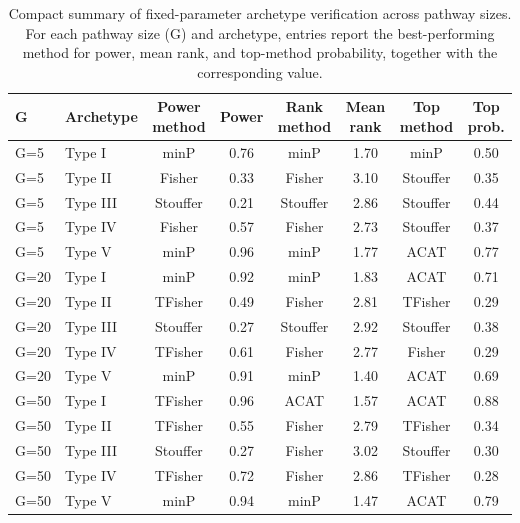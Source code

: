 \begin{table}[!t]
\centering
\caption{Compact summary of fixed-parameter archetype verification across pathway sizes. For each pathway size (G) and archetype, entries report the best-performing method for power, mean rank, and top-method probability, together with the corresponding value.}
\label{tab:supp_archetype_verification_byG}
\small
\begin{tabular}{llcccccc}
\hline
G & Archetype & Power method & Power & Rank method & Mean rank & Top method & Top prob.\\
\hline
G=5 & Type I & minP & 0.76 & minP & 1.70 & minP & 0.50\\
G=5 & Type II & Fisher & 0.33 & Fisher & 3.10 & Stouffer & 0.35\\
G=5 & Type III & Stouffer & 0.21 & Stouffer & 2.86 & Stouffer & 0.44\\
G=5 & Type IV & Fisher & 0.57 & Fisher & 2.73 & Stouffer & 0.37\\
G=5 & Type V & minP & 0.96 & minP & 1.77 & ACAT & 0.77\\
G=20 & Type I & minP & 0.92 & minP & 1.83 & ACAT & 0.71\\
G=20 & Type II & TFisher & 0.49 & Fisher & 2.81 & TFisher & 0.29\\
G=20 & Type III & Stouffer & 0.27 & Stouffer & 2.92 & Stouffer & 0.38\\
G=20 & Type IV & TFisher & 0.61 & Fisher & 2.77 & Fisher & 0.29\\
G=20 & Type V & minP & 0.91 & minP & 1.40 & ACAT & 0.69\\
G=50 & Type I & TFisher & 0.96 & ACAT & 1.57 & ACAT & 0.88\\
G=50 & Type II & TFisher & 0.55 & Fisher & 2.79 & TFisher & 0.34\\
G=50 & Type III & Stouffer & 0.27 & Fisher & 3.02 & Stouffer & 0.30\\
G=50 & Type IV & TFisher & 0.72 & Fisher & 2.86 & TFisher & 0.28\\
G=50 & Type V & minP & 0.94 & minP & 1.47 & ACAT & 0.79\\
\hline
\end{tabular}
\end{table}
